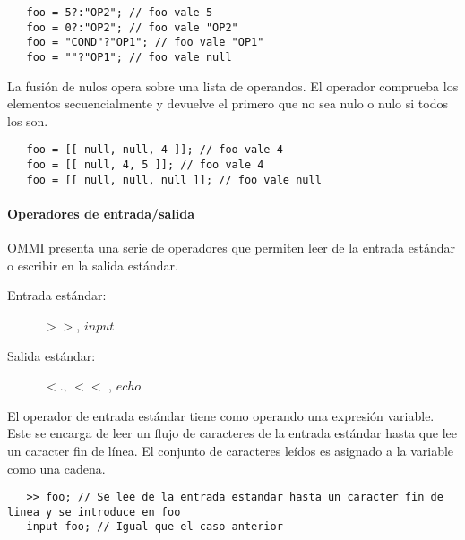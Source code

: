 \begin{lstlisting}
   foo = 5?:"OP2"; // foo vale 5
   foo = 0?:"OP2"; // foo vale "OP2"
   foo = "COND"?"OP1"; // foo vale "OP1"
   foo = ""?"OP1"; // foo vale null
\end{lstlisting} 

La fusión de nulos opera sobre una lista de operandos. El operador comprueba los elementos secuencialmente y devuelve el primero que no sea nulo o nulo si todos los son. \\

\begin{lstlisting}
   foo = [[ null, null, 4 ]]; // foo vale 4
   foo = [[ null, 4, 5 ]]; // foo vale 4
   foo = [[ null, null, null ]]; // foo vale null
\end{lstlisting}


\paragraph{Operadores de entrada/salida} \label{sec:op_io}
OMMI presenta una serie de operadores que permiten leer de la entrada estándar o
escribir en la salida estándar.

\begin{description}
\item [Entrada estándar:] $>>$, $input$
\item [Salida estándar:] $<.$, $<<$ , $echo$
\end{description} 

El operador de entrada estándar tiene como operando una expresión variable. Este se encarga de leer un flujo de caracteres de
la entrada estándar hasta que lee un caracter fin de línea. El conjunto de caracteres leídos es asignado a la variable como
una cadena. \\

\begin{lstlisting}
   >> foo; // Se lee de la entrada estandar hasta un caracter fin de linea y se introduce en foo
   input foo; // Igual que el caso anterior
\end{lstlisting}

